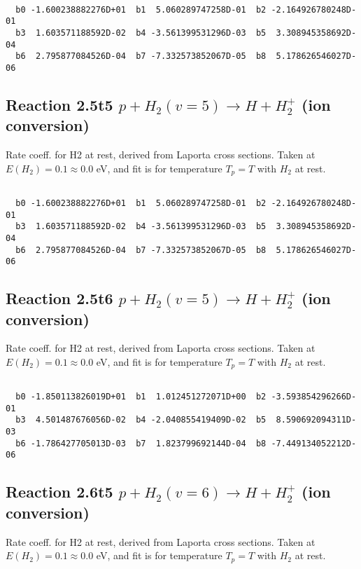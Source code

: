 \begin{small}\begin{verbatim}

  b0 -1.600238882276D+01  b1  5.060289747258D-01  b2 -2.164926780248D-01
  b3  1.603571188592D-02  b4 -3.561399531296D-03  b5  3.308945358692D-04
  b6  2.795877084526D-04  b7 -7.332573852067D-05  b8  5.178626546027D-06

\end{verbatim}\end{small}

\newpage
\subsection{
Reaction 2.5t5
$ p + H_2(v=5) \rightarrow H + H_2^+$ (ion conversion)
}
Rate coeff. for H2 at rest, derived from Laporta cross sections.
Taken at $E(H_2) = 0.1 \approx 0.0$ eV,  and fit is for temperature $T_p=T$ with $H_2$ at rest.

\begin{small}\begin{verbatim}

  b0 -1.600238882276D+01  b1  5.060289747258D-01  b2 -2.164926780248D-01
  b3  1.603571188592D-02  b4 -3.561399531296D-03  b5  3.308945358692D-04
  b6  2.795877084526D-04  b7 -7.332573852067D-05  b8  5.178626546027D-06

\end{verbatim}\end{small}

\newpage
\subsection{
Reaction 2.5t6
$ p + H_2(v=5) \rightarrow H + H_2^+$ (ion conversion)
}
Rate coeff. for H2 at rest, derived from Laporta cross sections.
Taken at $E(H_2) = 0.1 \approx 0.0$ eV,  and fit is for temperature $T_p=T$ with $H_2$ at rest.

\begin{small}\begin{verbatim}

  b0 -1.850113826019D+01  b1  1.012451272071D+00  b2 -3.593854296266D-01
  b3  4.501487676056D-02  b4 -2.040855419409D-02  b5  8.590692094311D-03
  b6 -1.786427705013D-03  b7  1.823799692144D-04  b8 -7.449134052212D-06

\end{verbatim}\end{small}

\newpage
\subsection{
Reaction 2.6t5
$ p + H_2(v=6) \rightarrow H + H_2^+$ (ion conversion)
}
Rate coeff. for H2 at rest, derived from Laporta cross sections.
Taken at $E(H_2) = 0.1 \approx 0.0$ eV,  and fit is for temperature $T_p=T$ with $H_2$ at rest.

